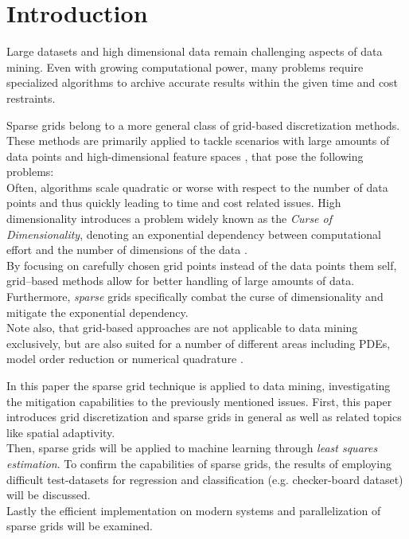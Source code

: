 \section{Introduction}
Large datasets and high dimensional data remain challenging aspects of data
mining. Even with growing computational power, many problems require
specialized algorithms to archive accurate results within the given time and
cost restraints.

\par

Sparse grids belong to a more general class of grid-based
discretization methods. These methods are primarily applied to
tackle scenarios with large amounts of data points and high-dimensional
feature spaces \cite{artbunshort}, that pose the following problems:
\\
Often, algorithms scale quadratic or worse with respect to the number of data points and
thus quickly leading to time and cost related issues.
High dimensionality introduces a problem widely known as the \emph{Curse of
Dimensionality}, denoting an exponential dependency between computational
effort and the number of dimensions of the data \cite{artbunshort, disspfl}. \\
By focusing on carefully chosen grid points instead
of the data points them self, grid--based methods allow for better handling of large amounts of data. 
Furthermore, \emph{sparse} grids specifically combat the curse of 
dimensionality and mitigate the exponential dependency. \\
Note also, that grid-based approaches are not applicable to data mining
exclusively, but are also
suited for a number of different areas including PDEs, model order
reduction \cite{disspeh} or numerical quadrature \cite{artbunlong}.

\par

In this paper the sparse grid technique is applied to data mining,
investigating the mitigation capabilities to the previously mentioned issues.
First, this paper introduces grid discretization and sparse grids in
general as well as related topics like spatial adaptivity. \\
Then, sparse grids will be applied to machine learning
through \emph{least squares estimation}. To confirm the capabilities
of sparse grids, the results of employing difficult
test-datasets for regression and classification (e.g.
checker-board dataset) will be discussed. \\
Lastly the efficient implementation on modern systems and parallelization of
sparse grids will be examined.

